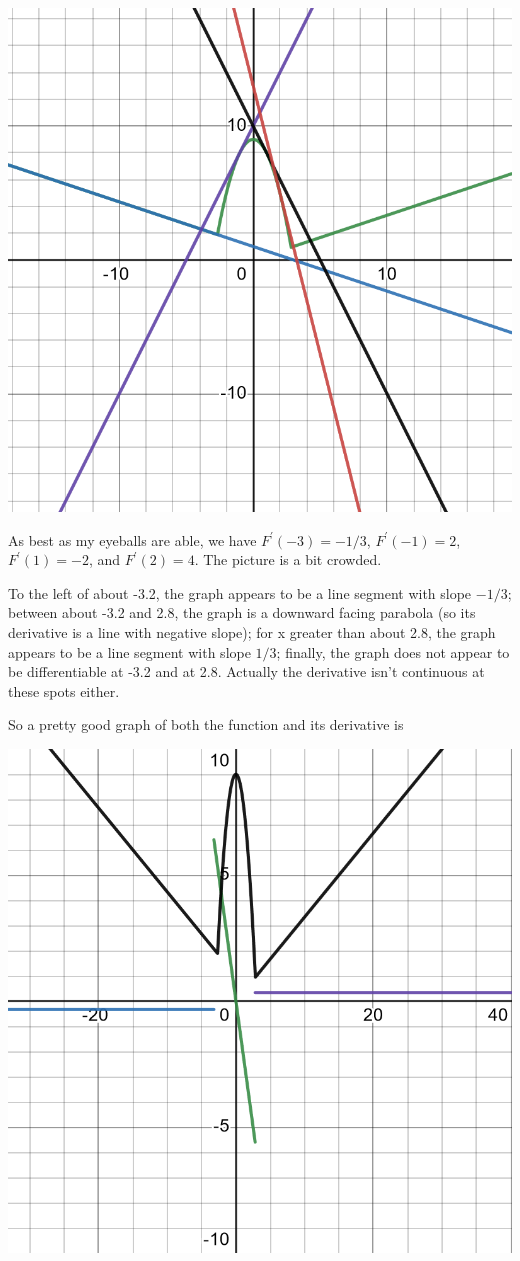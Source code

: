 \documentclass[12pt,fleqn,answers]{exam}
\begin{document}
\includegraphics[scale=0.5]{desmos-graph(47).png}

As best as my eyeballs are able, we have $F^\prime(-3)=-1/3$,
$F^\prime(-1)=2$, $F^\prime(1)=-2$, and $F^\prime(2)=4$. The 
picture is a bit crowded.

To the left of about -3.2, the graph appears to be a line segment 
with slope $-1/3$; between about -3.2 and 2.8, the graph is a 
downward facing parabola (so its derivative is a line with negative 
slope); for x greater than about 2.8, the graph appears 
to be a line segment with slope $1/3$; finally, the graph 
does not appear to be differentiable at -3.2 and at 2.8. Actually 
the derivative isn't continuous at these spots either.

So a pretty good graph of 
both the function and its derivative is 

\includegraphics[scale=0.5]{desmos-graph(48).png}

\end{document}
